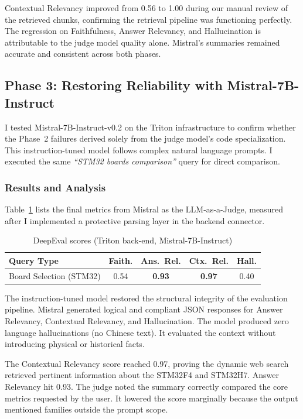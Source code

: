 Contextual Relevancy improved from 0.56 to 1.00 during our manual review of the retrieved chunks, confirming the retrieval pipeline was functioning perfectly. The regression on Faithfulness, Answer Relevancy, and Hallucination is attributable to the judge model quality alone. Mistral's summaries remained accurate and consistent across both phases.
\subsection{Phase 3: Restoring Reliability with Mistral-7B-Instruct}

I tested Mistral-7B-Instruct-v0.2 on the Triton infrastructure to confirm whether the Phase~2 failures derived solely from the judge model's code specialization. This instruction-tuned model follows complex natural language prompts. I executed the same \textit{``STM32 boards comparison''} query for direct comparison.

\subsubsection{Results and Analysis}

Table~\ref{tab:deepeval-mistral} lists the final metrics from Mistral as the LLM-as-a-Judge, measured after I implemented a protective parsing layer in the backend connector.

\begin{table}[ht]
    \centering
    \caption{DeepEval scores (Triton back-end, Mistral-7B-Instruct)}
    \label{tab:deepeval-mistral}
    \begin{tabular}{|l|c|c|c|c|}
        \hline
        \textbf{Query Type}     & \textbf{Faith.} & \textbf{Ans.\ Rel.} & \textbf{Ctx.\ Rel.} & \textbf{Hall.} \\
        \hline
        Board Selection (STM32) & 0.54            & \textbf{0.93}       & \textbf{0.97}       & 0.40           \\
        \hline
    \end{tabular}
\end{table}

The instruction-tuned model restored the structural integrity of the evaluation pipeline. Mistral generated logical and compliant JSON responses for Answer Relevancy, Contextual Relevancy, and Hallucination. The model produced zero language hallucinations (no Chinese text). It evaluated the context without introducing physical or historical facts.

The Contextual Relevancy score reached 0.97, proving the dynamic web search retrieved pertinent information about the STM32F4 and STM32H7. Answer Relevancy hit 0.93. The judge noted the summary correctly compared the core metrics requested by the user. It lowered the score marginally because the output mentioned families outside the prompt scope.

